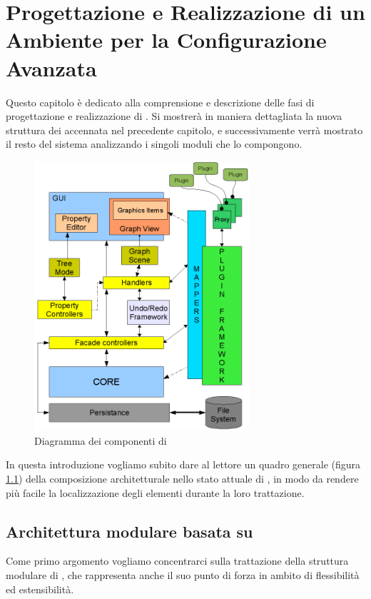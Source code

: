 \chapter{Progettazione e Realizzazione di un Ambiente per la Configurazione Avanzata}\label{capitolo:progettazione_realizzazione}
Questo capitolo è dedicato alla comprensione e descrizione delle fasi di progettazione e realizzazione di \visualnetkit{}. Si mostrerà in maniera dettagliata la nuova struttura dei \plugin{} accennata nel precedente capitolo, e successivamente verrà mostrato il resto del sistema analizzando i singoli moduli che lo compongono.

\begin{figure}[!htb]
	\centering
	\includegraphics[width=8cm]{images/diagramma_componenti_vnetkit.png}
	\caption{Diagramma dei componenti di \visualnetkit{}}
	\label{figura:vn_componenti}
\end{figure}

In questa introduzione vogliamo subito dare al lettore un quadro generale (figura \ref{figura:vn_componenti}) della composizione architetturale nello stato attuale di \visualnetkit{}, in modo da rendere più facile la localizzazione degli elementi durante la loro trattazione.

\section{Architettura modulare basata su \plugin{}}
Come primo argomento vogliamo concentrarci sulla trattazione della struttura modulare di \visualnetkit{}, che rappresenta anche il suo punto di forza in ambito di flessibilità ed estensibilità. 

